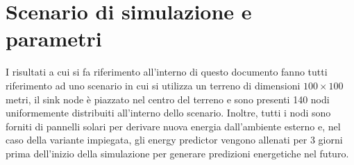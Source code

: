 \documentclass[binding=0.6cm,TFA]{sapthesis}
\begin{document}
\section{Scenario di simulazione e parametri}

I risultati a cui si fa riferimento all'interno di questo documento fanno tutti riferimento ad uno scenario in cui si utilizza un terreno di dimensioni
$100 \times 100$ metri, il sink node è piazzato nel centro del terreno e sono presenti 140 nodi uniformemente distribuiti all'interno dello scenario.
Inoltre, tutti i nodi sono forniti di pannelli solari per derivare nuova energia dall'ambiente esterno e, nel caso della variante impiegata, gli energy predictor
vengono allenati per 3 giorni prima dell'inizio della simulazione per generare predizioni energetiche nel futuro.\\
\end{document}

